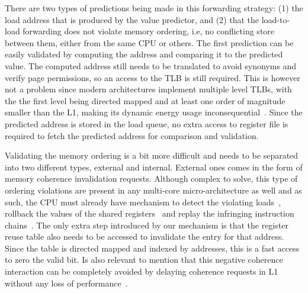 \documentclass{sig-alternate}
\begin{document}
There are two types of predictions being made in this forwarding strategy: (1) the load address that is produced by the value predictor, and (2) that the load-to-load forwarding does not violate memory ordering, i.e, no conflicting store between them, either from the same CPU or others. The first prediction can be easily validated by computing the address and comparing it to the predicted value. The computed address still needs to be translated to avoid synonyms and verify page permissions, so an access to the TLB is still required. This is however not a problem since modern architectures implement multiple level TLBs, with the the first level being directed mapped and at least one order of magnitude smaller than the L1, making its dynamic energy usage inconsequential~\cite{}. Since the predicted address is stored in the load queue, no extra access to register file is required to fetch the predicted address for comparison and validation.

Validating the memory ordering is a bit more difficult and needs to be separated into two different types, external and internal. External ones comes in the form of memory coherence invalidation requests. Although complex to solve, this type of ordering violations are present in any multi-core micro-architecture as well and as such, the CPU must already have mechanism to detect the violating loads~\cite{}, rollback the values of the shared registers~\cite{} and replay the infringing instruction chains~\cite{}. The only extra step introduced by our mechanism is that the register reuse table also needs to be accessed to invalidate the entry for that address. Since the table is directed mapped and indexed by addresses, this is a fast access to zero the valid bit. Is also relevant to mention that this negative coherence interaction can be completely avoided by delaying coherence requests in L1 without any loss of performance~\cite{}.
\end{document}
